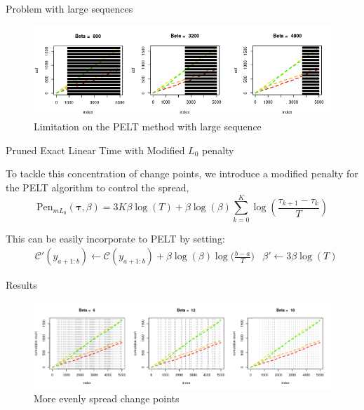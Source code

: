 \documentclass{beamer}
\begin{document}
\begin{frame}{Problem with large sequences}
    \begin{figure}
        \centering
        \includegraphics[scale=0.5]{PELT_limi.png}
        \caption{Limitation on the PELT method with large sequence}
        \label{fig:my_label}
    \end{figure}
\end{frame}

\begin{frame}{Pruned Exact Linear Time with Modified $L_0$ penalty}
\item To tackle this concentration of change points, we introduce a modified penalty for the PELT algorithm to control the spread,
\begin{equation}
    \label{modl0}
    \text{Pen}_{mL_0}(\bm{\tau}, \beta) = 3K\beta\log(T) + \beta\log(\beta)\sum_{k = 0}^K \log(\frac{\tau_{k+1} - \tau_{k}}{T})
\end{equation}

This can be easily incorporate to PELT by setting:
\begin{align}
    &\mathcal{C'}(y_{a+1:b}) \leftarrow \mathcal{C}(y_{a+1:b}) + \beta\log(\beta)\log\bigg({\frac{b-a}{T}}\bigg) & \beta' \leftarrow 3\beta\log(T)
\end{align}

\end{frame}

\begin{frame}{Results}
    \begin{figure}
        \centering
        \includegraphics[scale=0.43]{PELTBIC_3.png}
        \caption{More evenly spread change points}
        \label{fig:my_label}
    \end{figure}
\end{frame}
\end{document}
